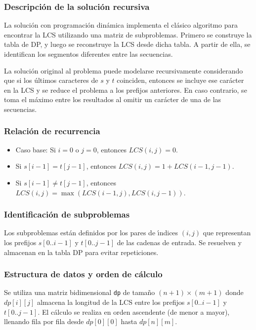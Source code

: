 \subsubsection{Descripción de la solución recursiva}
La soluci\'on con programaci\'on din\'amica implementa el cl\'asico algoritmo para encontrar la LCS utilizando una matriz de subproblemas. Primero se construye la tabla de DP, y luego se reconstruye la LCS desde dicha tabla. A partir de ella, se identifican los segmentos diferentes entre las secuencias.

La soluci\'on original al problema puede modelarse recursivamente considerando que si los \'{u}ltimos caracteres de $s$ y $t$ coinciden, entonces se incluye ese car\'acter en la LCS y se reduce el problema a los prefijos anteriores. En caso contrario, se toma el m\'aximo entre los resultados al omitir un car\'acter de una de las secuencias.

\subsubsection{Relación de recurrencia}
\begin{itemize}
  \item Caso base: Si $i = 0$ o $j = 0$, entonces $LCS(i, j) = 0$.
  \item Si $s[i-1] = t[j-1]$, entonces $LCS(i, j) = 1 + LCS(i-1, j-1)$.
  \item Si $s[i-1] \neq t[j-1]$, entonces $LCS(i, j) = \max(LCS(i-1, j), LCS(i, j-1))$.
\end{itemize}

\subsubsection{Identificación de subproblemas}
Los subproblemas est\'an definidos por los pares de \'{\i}ndices $(i, j)$ que representan los prefijos $s[0..i-1]$ y $t[0..j-1]$ de las cadenas de entrada. Se resuelven y almacenan en la tabla DP para evitar repeticiones.

\subsubsection{Estructura de datos y orden de cálculo}

Se utiliza una matriz bidimensional \texttt{dp} de tama\~no $(n+1) \times (m+1)$ donde $dp[i][j]$ almacena la longitud de la LCS entre los prefijos $s[0..i-1]$ y $t[0..j-1]$. El c\'alculo se realiza en orden ascendente (de menor a mayor), llenando fila por fila desde $dp[0][0]$ hasta $dp[n][m]$.

